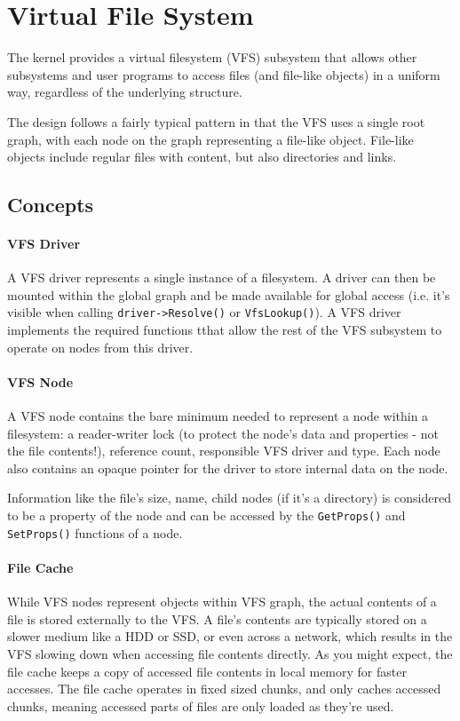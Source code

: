 \section{Virtual File System}
The kernel provides a virtual filesystem (VFS) subsystem that allows other subsystems and user programs to access files (and file-like objects) in a uniform way, regardless of the underlying structure.

The design follows a fairly typical pattern in that the VFS uses a single root graph, with each node on the graph representing a file-like object. File-like objects include regular files with content, but also directories and links.

\subsection{Concepts}
\paragraph{VFS Driver}
A VFS driver represents a single instance of a filesystem. A driver can then be mounted within the global graph and be made available for global access (i.e. it's visible when calling \verb|driver->Resolve()| or \verb|VfsLookup()|). A VFS driver implements the required functions tthat allow the rest of the VFS subsystem to operate on nodes from this driver.

\paragraph{VFS Node}
A VFS node contains the bare minimum needed to represent a node within a filesystem: a reader-writer lock (to protect the node's data and properties - not the file contents!), reference count, responsible VFS driver and type. Each node also contains an opaque pointer for the driver to store internal data on the node. 

Information like the file's size, name, child nodes (if it's a directory) is considered to be a property of the node and can be accessed by the \verb|GetProps()| and \verb|SetProps()| functions of a node.

\paragraph{File Cache}
While VFS nodes represent objects within VFS graph, the actual contents of a file is stored externally to the VFS. A file's contents are typically stored on a slower medium like a HDD or SSD, or even across a network, which results in the VFS slowing down when accessing file contents directly. As you might expect, the file cache keeps a copy of accessed file contents in local memory for faster accesses. The file cache operates in fixed sized chunks, and only caches accessed chunks, meaning accessed parts of files are only loaded as they're used.

